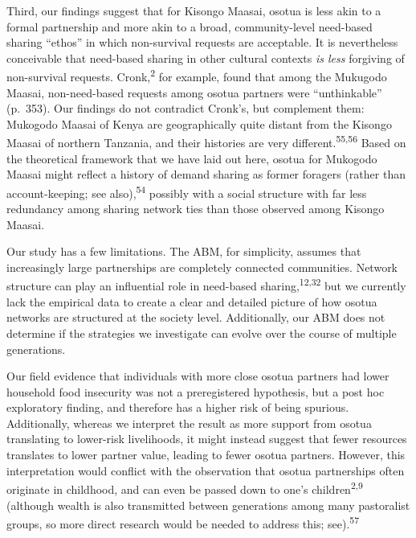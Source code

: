 \documentclass[
]{article}
\begin{document}
Third, our findings suggest that for Kisongo Maasai, osotua is less akin to a formal partnership and more akin to a broad, community-level need-based sharing ``ethos'' in which non-survival requests are acceptable. It is nevertheless conceivable that need-based sharing in other cultural contexts \emph{is less} forgiving of non-survival requests. Cronk,\textsuperscript{2} for example, found that among the Mukugodo Maasai, non-need-based requests among osotua partners were ``unthinkable'' (p.~353). Our findings do not contradict Cronk's, but complement them: Mukogodo Maasai of Kenya are geographically quite distant from the Kisongo Maasai of northern Tanzania, and their histories are very different.\textsuperscript{55,56} Based on the theoretical framework that we have laid out here, osotua for Mukogodo Maasai might reflect a history of demand sharing as former foragers (rather than account-keeping; see also),\textsuperscript{54} possibly with a social structure with far less redundancy among sharing network ties than those observed among Kisongo Maasai.

Our study has a few limitations. The ABM, for simplicity, assumes that increasingly large partnerships are completely connected communities. Network structure can play an influential role in need-based sharing,\textsuperscript{12,32} but we currently lack the empirical data to create a clear and detailed picture of how osotua networks are structured at the society level. Additionally, our ABM does not determine if the strategies we investigate can evolve over the course of multiple generations.

Our field evidence that individuals with more close osotua partners had lower household food insecurity was not a preregistered hypothesis, but a post hoc exploratory finding, and therefore has a higher risk of being spurious. Additionally, whereas we interpret the result as more support from osotua translating to lower-risk livelihoods, it might instead suggest that fewer resources translates to lower partner value, leading to fewer osotua partners. However, this interpretation would conflict with the observation that osotua partnerships often originate in childhood, and can even be passed down to one's children\textsuperscript{2,9} (although wealth is also transmitted between generations among many pastoralist groups, so more direct research would be needed to address this; see).\textsuperscript{57}
\end{document}
